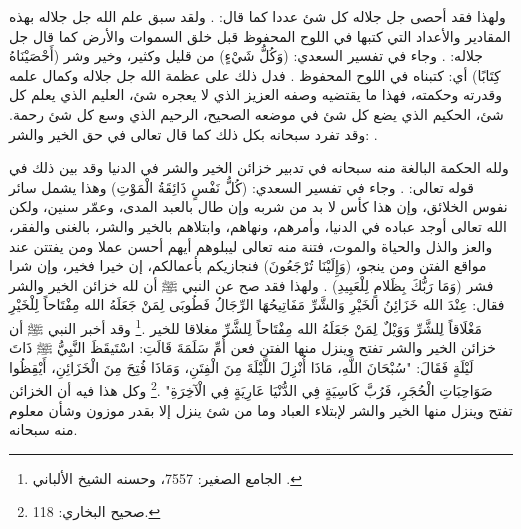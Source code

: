 ولهذا فقد أحصى جل جلاله كل شئ عددا كما قال:
\quranayah*[72][28][10]{\footnotesize \surahname*[72]}. ولقد سبق علم الله جل جلاله بهذه المقادير والأعداد التي كتبها في اللوح المحفوظ قبل خلق السموات والأرض كما قال جل جلاله: \quranayah*[78][29]{\footnotesize \surahname*[78]}. وجاء في تفسير السعدي: (وَكُلُّ شَيْءٍ) من قليل وكثير، وخير وشر (أَحْصَيْنَاهُ كِتَابًا) أي: كتبناه في اللوح المحفوظ \href{https://shamela.ws/book/42/2064#p9}{\faExternalLink} \cite{tafsir_Saadi}. فدل ذلك على عظمة الله جل جلاله وكمال علمه وقدرته وحكمته، فهذا ما يقتضيه وصفه العزيز الذي لا يعجره شئ، العليم الذي يعلم كل شئ، الحكيم الذي يضع كل شئ في موضعه الصحيح، الرحيم الذي وسع كل شئ رحمة. وقد تفرد سبحانه بكل ذلك كما قال تعالى في حق الخير والشر: 
\quranayah*[10][107]{\footnotesize \surahname*[10]}.

ولله الحكمة البالغة منه سبحانه في تدبير خزائن الخير والشر في الدنيا وقد بين ذلك  في قوله تعالى: \quranayah*[21][35]{\footnotesize \surahname*[21]}. وجاء في تفسير السعدي:  (كُلُّ نَفْسٍ ذَائِقَةُ الْمَوْتِ) وهذا يشمل سائر نفوس الخلائق، وإن هذا كأس لا بد من شربه وإن طال بالعبد المدى، وعمّر سنين، ولكن الله تعالى أوجد عباده في الدنيا، وأمرهم، ونهاهم، وابتلاهم بالخير والشر، بالغنى والفقر، والعز والذل والحياة والموت، فتنة منه تعالى ليبلوهم أيهم أحسن عملا ومن يفتتن عند مواقع الفتن ومن ينجو، (وَإِلَيْنَا تُرْجَعُونَ) فنجازيكم بأعمالكم، إن خيرا فخير، وإن شرا فشر (وَمَا رَبُّكَ بِظَلامٍ لِلْعَبِيدِ) \href{https://shamela.ws/book/42/1178#p3}{\faExternalLink} \cite{tafsir_Saadi}. ولهذا فقد صح عن النبي ﷺ أن لله خزائن الخير والشر فقال: عِنْدَ الله خَزَائِنُ الخَيْرِ وَالشَّرِّ مَفَاتِيحُهَا الرِّجَالُ فَطُوبَى لِمَنْ جَعَلَهُ الله مِفْتَاحاً لِلْخَيْرِ مَغْلَاقاً لِلشَّرِّ وَوَيْلٌ لِمَنْ جَعَلَهُ الله مِفْتَاحاً لِلشَّرِّ مغلاقا للخير \href{https://shamela.ws/book/21659/7557#p1}{\faExternalLink} \cite{jamaaSagheer}.\footnote{الجامع الصغير: 7557، وحسنه الشيخ الألباني .} وقد أخبر النبي ﷺ أن خزائن الخير والشر تفتح وينزل منها الفتن فعن أُمِّ سَلَمَةَ قَالَتِ: اسْتَيقَظَ النَّبِيُّ ﷺ ذَاتَ لَيْلَةٍ فَقَالَ: "سُبْحَانَ اللَّهِ، مَاذَا أُنْزِلَ اللَّيْلَةَ مِنَ الْفِتَنِ، وَمَاذَا فُتِحَ مِنَ الْخَزَائِنِ، أَيْقِظُوا صَوَاحِبَاتِ الْحُجَرِ، فَرُبَّ كَاسِيَةٍ فِي الدُّنْيَا عَارِيَةٍ فِي الْآخِرَةِ" \href{https://shamela.ws/book/1284/251#p1}{\faExternalLink} \cite{bukhari}.\footnote{صحيح البخاري: 118.} وكل هذا فيه أن الخزائن تفتح وينزل منها الخير والشر لإبتلاء العباد وما من شئ ينزل إلا بقدر موزون وشأن معلوم منه سبحانه.

